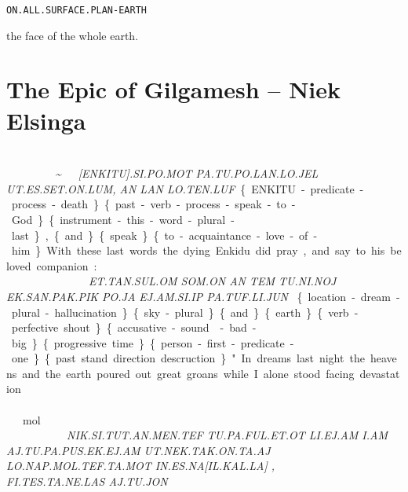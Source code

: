 {{\tt ON.ALL.SURFACE.PLAN-EARTH }

the face of the whole earth. 
\drie
\vfill

\pagebreak
\section{The Epic of Gilgamesh -- {\small Niek Elsinga}}



\drie
\drie
 

\cartouche{\en\ki\tu}\si\po\mot~\tu\po\lan\lo\jel~~ \\ \ut\es\set\on\lum\comma \an\lan\~\lo\ten\luf
 
{\it [ENKITU].SI.PO.MOT PA.TU.PO.LAN.LO.JEL \\UT.ES.SET.ON.LUM, AN LAN  LO.TEN.LUF}

\{ENKITU-predicate-process-death\} \{past-verb-process-speak-to-God\} \{instrument-this-word-plural-last\}, \{and\} \{speak\} \{to-acquaintance-love-of-him\} 

With these last words the dying Enkidu did pray, and say to his beloved companion:  

\drie 
 
\et\Atlantan\sul~ \som\on~\an~\tem~\tu\Atlanni\noj~\\ \ek\san\pak\pik~ ~\po\ja~\su~\ej\am\si\ip~\pa\tuf\li\jun 

{\it ET.TAN.SUL.OM SOM.ON AN TEM TU.NI.NOJ \\EK.SAN.PAK.PIK PO.JA EJ.AM.SI.IP PA.TUF.LI.JUN }

\{location-dream-plural-hallucination\} \{sky-plural\} \{and\} \{earth\} \{verb-perfective shout\} \{accusative-sound-bad-big\} \{progressive time\} \{person-first-predicate-one\} \{past stand direction descruction\}

"In dreams last night the heavens and the earth poured out great groans while I alone stood facing devastation.  

\drie 

\nik\si\tut\an\men\tef ~ \tu\pa\ful\et\ot ~ \li\ej\am ~ \Atlani\am\\ ~ \at\tu\pa\pus\ek\ej\am ~ \ut\nek\tak\on\ta\aj\\ ~ \lo\nap\mol\tef\ta\mot \Atlanin\es\na\cartouche{\il\kal\la} ~\\\comma\Atlanfi\tes\ta\Atlanne\las ~ \comma\aj\tu\jon

{\it NIK.SI.TUT.AN.MEN.TEF TU.PA.FUL.ET.OT LI.EJ.AM I.AM\\ AJ.TU.PA.PUS.EK.EJ.AM UT.NEK.TAK.ON.TA.AJ\\ LO.NAP.MOL.TEF.TA.MOT IN.ES.NA[IL.KAL.LA] ,\\FI.TES.TA.NE.LAS AJ.TU.JON }

}
